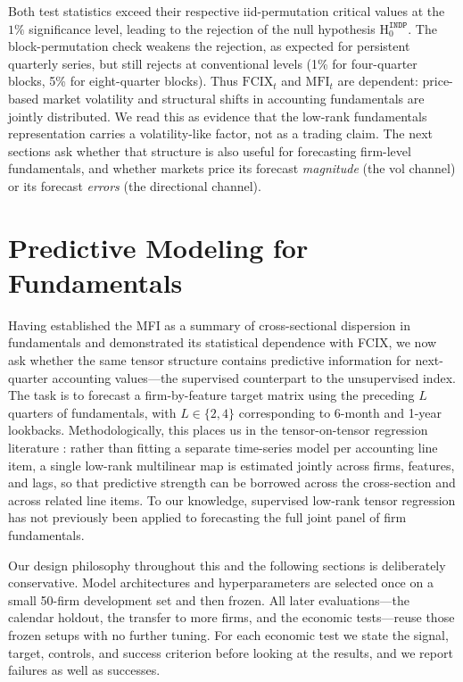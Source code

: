 \documentclass[pdflatex,sn-mathphys-num]{sn-jnl}%
\theoremstyle{thmstyleone}%
\theoremstyle{thmstyletwo}%
\theoremstyle{thmstylethree}%
\begin{document}
Both test statistics exceed their respective iid-permutation critical values at the $1\%$ significance level, leading to the rejection of the null hypothesis $\mathrm{H}_0^{\mathtt{INDP}}$. The block-permutation check weakens the rejection, as expected for persistent quarterly series, but still rejects at conventional levels (1\% for four-quarter blocks, 5\% for eight-quarter blocks). Thus $\mathrm{FCIX}_t$ and $\mathrm{MFI}_t$ are dependent: price-based market volatility and structural shifts in accounting fundamentals are jointly distributed. We read this as evidence that the low-rank fundamentals representation carries a volatility-like factor, not as a trading claim. The next sections ask whether that structure is also useful for forecasting firm-level fundamentals, and whether markets price its forecast \emph{magnitude} (the vol channel) or its forecast \emph{errors} (the directional channel).






\FloatBarrier
\section{Predictive Modeling for Fundamentals}
\label{Section:Predictive_Fundamentals}

Having established the MFI as a summary of cross-sectional dispersion in fundamentals and demonstrated its statistical dependence with FCIX, we now ask whether the same tensor structure contains predictive information for next-quarter accounting values---the supervised counterpart to the unsupervised index. The task is to forecast a firm-by-feature target matrix using the preceding $L$ quarters of fundamentals, with $L \in \{2,4\}$ corresponding to 6-month and 1-year lookbacks. Methodologically, this places us in the tensor-on-tensor regression literature \citep{zhou2013tensor, hoff2015multilinear, lock2018tensor}: rather than fitting a separate time-series model per accounting line item, a single low-rank multilinear map is estimated jointly across firms, features, and lags, so that predictive strength can be borrowed across the cross-section and across related line items. To our knowledge, supervised low-rank tensor regression has not previously been applied to forecasting the full joint panel of firm fundamentals.

Our design philosophy throughout this and the following sections is deliberately conservative. Model architectures and hyperparameters are selected once on a small 50-firm development set and then frozen. All later evaluations---the calendar holdout, the transfer to more firms, and the economic tests---reuse those frozen setups with no further tuning. For each economic test we state the signal, target, controls, and success criterion before looking at the results, and we report failures as well as successes.
\end{document}
